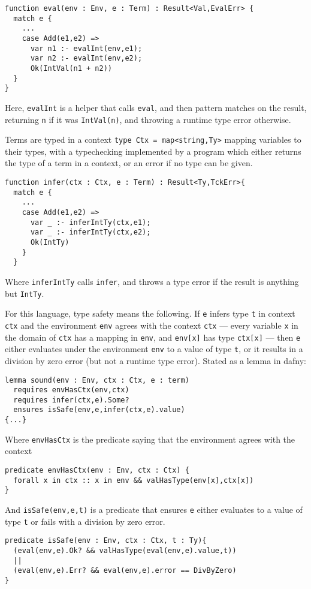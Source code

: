\documentclass[sigplan,review,screen,anonymous]{acmart}
\begin{document}
\begin{verbatim}
function eval(env : Env, e : Term) : Result<Val,EvalErr> {
  match e {
    ...
    case Add(e1,e2) =>
      var n1 :- evalInt(env,e1);
      var n2 :- evalInt(env,e2);
      Ok(IntVal(n1 + n2))
  }
}
\end{verbatim}
Here, \texttt{evalInt} is a helper that calls \texttt{eval}, and then pattern matches on the result,
returning \texttt{n} if it was \texttt{IntVal(n)}, and throwing a runtime type error otherwise.

Terms are typed in a context \texttt{type Ctx = map<string,Ty>} mapping variables to their types,
with a typechecking implemented by a program 
which either returns the type of a term in a context, or an error if no type can be given.
\begin{verbatim}
function infer(ctx : Ctx, e : Term) : Result<Ty,TckErr>{
  match e {
    ...
    case Add(e1,e2) =>
      var _ :- inferIntTy(ctx,e1);
      var _ :- inferIntTy(ctx,e2);
      Ok(IntTy)
    }
  }
\end{verbatim}
Where \texttt{inferIntTy} calls \texttt{infer}, and throws a type error if the result is anything but \texttt{IntTy}.


For this language, type safety means the following. If \texttt{e} infers type \texttt{t} in context
\texttt{ctx} and the environment
\texttt{env} agrees with the context \texttt{ctx} --- every variable \texttt{x}
in the domain of \texttt{ctx} has a mapping in \texttt{env}, and \texttt{env[x]} has type \texttt{ctx[x]} ---
then \texttt{e} either evaluates under the environment \texttt{env} to a value of type \texttt{t}, or it results
in a division by zero error (but not a runtime type error). Stated as a lemma in dafny:

\begin{verbatim}
lemma sound(env : Env, ctx : Ctx, e : term)
  requires envHasCtx(env,ctx)
  requires infer(ctx,e).Some?
  ensures isSafe(env,e,infer(ctx,e).value)
{...}
\end{verbatim}

Where \texttt{envHasCtx} is the predicate saying that the environment agrees with the context
\begin{verbatim}
predicate envHasCtx(env : Env, ctx : Ctx) {
  forall x in ctx :: x in env && valHasType(env[x],ctx[x])
}
\end{verbatim}

And \texttt{isSafe(env,e,t)} is a predicate that ensures
\texttt{e} either evaluates to a value of type \texttt{t}
or fails with a division by zero error.
\begin{verbatim}
predicate isSafe(env : Env, ctx : Ctx, t : Ty){
  (eval(env,e).Ok? && valHasType(eval(env,e).value,t))
  ||
  (eval(env,e).Err? && eval(env,e).error == DivByZero)
}
\end{verbatim}
\end{document}
